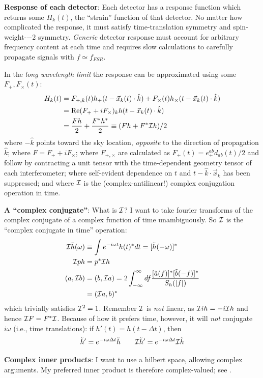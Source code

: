 \documentclass[twocolumn,prd,nofootinbib]{revtex4}
\begin{document}
\noindent \textbf{Response of each detector}: Each detector has a response function which returns some $H_k(t)$, the
``strain'' function of that detector.  No matter how complicated the response, it must satisfy time-translation symmetry and spin-weight-$-2$ symmetry.
 \emph{Generic} detector response must account for arbitrary frequency
content at each time and requires slow calculations to carefully propagate signals with $f\simeq f_{FSR}$.  

In the
\emph{long wavelength limit} the response can be approximated using some $F_+,F_\times(t)$:
\begin{align}
H_k(t) &=F_{+,k}(t) h_+(t-\vec{x}_k(t)\cdot \hat{k}) + F_\times(t) h_\times(t-\vec{x}_k(t)\cdot \hat{k}) \\
 &= \text{Re}(F_++i F_\times)_k h(t-\vec{x}_k(t)\cdot \hat{k}) \\
 &=  \frac{F h }{2} + \frac{F^*h^*}{2} \equiv (Fh  + F^*{\cal I} h)/2
\end{align}
where $-\hat{k}$ points toward the sky location, \emph{opposite} to the direction of propagation $\hat{k}$; where $F=F_++i F_\times$;
where $F_{+,\times}$ are calculated as $F_+(t)=e_+^{ab}d_{ab}(t)/2$ and follow by contracting a unit tensor with the time-dependent geometry tensor of each
interferometer; where self-evident dependence on $t$ and $t-\hat{k}\cdot \vec{x}_k$ has been suppressed; and
where ${\cal I}$ is the (complex-antilinear!) complex conjugation operation in time.   
\begin{shaded}
\noindent \textbf{A ``complex conjugate''}: What is  ${\cal I}$? I want to take fourier transforms of the complex
conjugate of a  complex function of time
unambiguously.  So ${\cal I}$ is the ``complex conjugate in time'' operation:
\begin{align}
{\cal I}\tilde{h}(\omega) &\equiv \int e^{-i\omega t} h(t)^* dt  = [\tilde{h}(-\omega)]^* \\
{\cal I} p h &= p^* {\cal I} h \\
(a,{\cal I} b) & = (b,{\cal I}a) = 2 \int_{-\infty}^{\infty} df \frac{[\tilde{a}(f)]^*[\tilde{b}(-f)]^*}{S_h(|f|)}\\
 &= ({\cal I} a,b)^*
\end{align}
which trivially satisfies ${\cal I}^2=1$.  Remember ${\cal I}$ is \emph{not} linear, as ${\cal I} i h = -i {\cal I} h$
and hence ${\cal I}F=F^*{\cal I}$.  
Because of how it prefers time, however, it will \emph{not} conjugate  $i\omega$ (i.e., time translations):  if $h'(t)=h(t-\Delta t)$, then 
\begin{eqnarray}
\tilde{h}' = e^{-i\omega \Delta t}\tilde{h} \qquad {\cal I}\tilde{h}' = e^{-i\omega \Delta t} {\cal I}\tilde{h}
\end{eqnarray}


\noindent \textbf{Complex inner products}: I want to use a hilbert space, allowing complex arguments.  My preferred inner product is
therefore complex-valued; see \cite{gwastro-mergers-HeeSuk-FisherMatrixWithAmplitudeCorrections}. 
\end{shaded}
\end{document}
